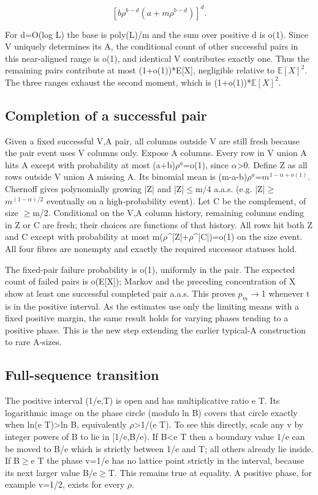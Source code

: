 \documentclass[11pt]{article}
\begin{document}
\[
\left[b\rho^{b-d}(a+m\rho^{b-d})\right]^d.
\]

For d=O(log L) the base is poly(L)/m and the sum over positive d is o(1). Since V uniquely determines its A, the conditional count of other successful pairs in this near-aligned range is o(1), and identical V contributes exactly one. Thus the remaining pairs contribute at most (1+o(1))*E[X], negligible relative to $\mathbb E[X]^2$. The three ranges exhaust the second moment, which is (1+o(1))*$\mathbb E[X]^2$.

\subsection{Completion of a successful pair}

Given a fixed successful V,A pair, all columns outside V are still fresh because the pair event uses V columns only. Expose A columns. Every row in V union A hits A except with probability at most (a+b)$\rho^{a}$=o(1), since $\alpha$>0. Define Z as all rows outside V union A missing A. Its binomial mean is (m-a-b)$\rho^{a}$=$m^{1-\alpha+o(1)}$. Chernoff gives polynomially growing |Z| and |Z|\ensuremath{\leq}m/4 a.a.s. (e.g. |Z|\ensuremath{\geq}$m^{(1-\alpha)/2}$ eventually on a high-probability event). Let C be the complement, of size \ensuremath{\geq}m/2. Conditional on the V,A column history, remaining columns ending in Z or C are fresh; their choices are functions of that history. All rows hit both Z and C except with probability at most m($\rho$\textasciicircum{}|Z|+$\rho$\textasciicircum{}|C|)=o(1) on the size event. All four fibres are nonempty and exactly the required successor statuses hold.

The fixed-pair failure probability is o(1), uniformly in the pair. The expected count of failed pairs is o(E[X]); Markov and the preceding concentration of X show at least one successful completed pair a.a.s. This proves $p_m$\ensuremath{\to}1 whenever t is in the positive interval. As the estimates use only the limiting means with a fixed positive margin, the same result holds for varying phases tending to a positive phase. This is the new step extending the earlier typical-A construction to rare A-sizes.

\subsection{Full-sequence transition}

The positive interval (1/e,T) is open and has multiplicative ratio e T. Its logarithmic image on the phase circle (modulo ln B) covers that circle exactly when ln(e T)>ln B, equivalently $\rho$>1/(e T). To see this directly, scale any v by integer powers of B to lie in [1/e,B/e). If B<e T then a boundary value 1/e can be moved to B/e which is strictly between 1/e and T; all others already lie inside. If B\ensuremath{\geq}e T the phase v=1/e has no lattice point strictly in the interval, because its next larger value B/e\ensuremath{\geq}T. This remains true at equality. A positive phase, for example v=1/2, exists for every $\rho$.
\end{document}
